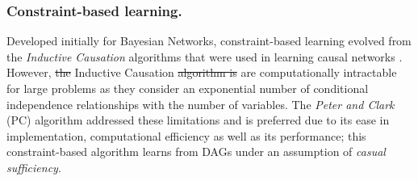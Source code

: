 \documentclass[7pt]{article}
\begin{document}

\subsubsection{Constraint-based  learning.}	

Developed initially for Bayesian Networks, constraint-based learning evolved from the \emph{Inductive Causation} algorithms that were used in learning causal networks \cite{verma1991equivalence}. However,  \st{the}  {Inductive Causation} \st{algorithm is} are computationally intractable for large problems as they consider an exponential number of conditional independence relationships with the number of variables. The \emph{Peter and Clark} (PC) algorithm addressed these limitations \cite{spirtes1991algorithm, colombo2014order, spirtes2000causation} and is preferred due to its ease in implementation, computational efficiency as well as its performance; this constraint-based algorithm learns from  DAGs under an assumption of \emph{casual sufficiency}. 
\end{document}
